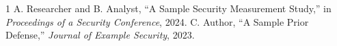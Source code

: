 \documentclass[conference]{IEEEtran}
\begin{document}

\maketitle
\pagestyle{IEEEtitlepagestyle}











\begin{thebibliography}{1}
 A. Researcher and B. Analyst, ``A Sample Security Measurement Study,'' in \emph{Proceedings of a Security Conference}, 2024.
 C. Author, ``A Sample Prior Defense,'' \emph{Journal of Example Security}, 2023.
\end{thebibliography}
\end{document}
